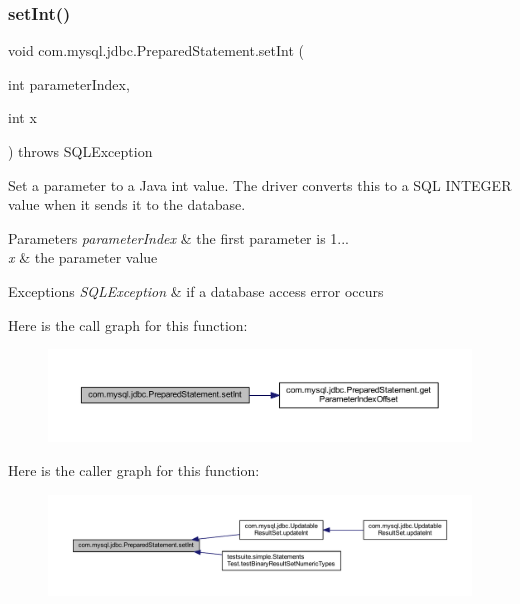\subsubsection{\texorpdfstring{set\+Int()}{setInt()}}
{\footnotesize\ttfamily void com.\+mysql.\+jdbc.\+Prepared\+Statement.\+set\+Int (\begin{DoxyParamCaption}\item[{int}]{parameter\+Index,  }\item[{int}]{x }\end{DoxyParamCaption}) throws S\+Q\+L\+Exception}

Set a parameter to a Java int value. The driver converts this to a S\+QL I\+N\+T\+E\+G\+ER value when it sends it to the database.


\begin{DoxyParams}{Parameters}
{\em parameter\+Index} & the first parameter is 1... \\
\hline
{\em x} & the parameter value\\
\hline
\end{DoxyParams}

\begin{DoxyExceptions}{Exceptions}
{\em S\+Q\+L\+Exception} & if a database access error occurs \\
\hline
\end{DoxyExceptions}
Here is the call graph for this function\+:
\nopagebreak
\begin{figure}[H]
\begin{center}
\leavevmode
\includegraphics[width=350pt]{classcom_1_1mysql_1_1jdbc_1_1_prepared_statement_ae9efafe8af966733befb3f271c7d902c_cgraph}
\end{center}
\end{figure}
Here is the caller graph for this function\+:
\nopagebreak
\begin{figure}[H]
\begin{center}
\leavevmode
\includegraphics[width=350pt]{classcom_1_1mysql_1_1jdbc_1_1_prepared_statement_ae9efafe8af966733befb3f271c7d902c_icgraph}
\end{center}
\end{figure}
\mbox{\label{classcom_1_1mysql_1_1jdbc_1_1_prepared_statement_a56039ead85e37c1c6d019cb62f584ef9}} 
